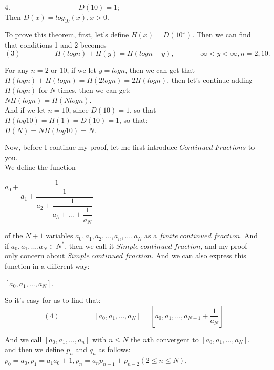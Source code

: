 \documentclass[12pt]{article}
\begin{document}
$4. \hspace{4cm} D(10)=1;$\\
Then $D(x)=log_{10}(x), x>0.$\\
\par To prove this theorem, first, let's define $H(x)=D(10^x)$. Then we can find that conditions 1 and 2 becomes
\begin{equation*}
(3)\hspace{2cm} H(logn)+H(y)=H(logn+y),\hspace{1cm} -\infty <y< \infty, n=2,10.
\end{equation*}
\par For any $n=2$ or $10$, if we let $y=logn$, then we can get that $H(logn)+H(logn)=H(2logn)=2H(logn)$, then let's continue adding $H(logn)$ for $N$ times, then we can get:\\
$NH(logn)=H(Nlogn)$.\\
And if we let $n=10$, since $D(10)=1$, so that $H(log10)=H(1)=D(10)=1$, so that:\\
$H(N)=NH(log10)=N$.\\
\par Now, before I continue my proof, let me first introduce $Continued\;Fractions$ to you.\\
We define the function \\
\begin{center}
$a_0+\dfrac{1}{a_1+\dfrac{1}{a_2+\dfrac{1}{a_3+...+\dfrac{1}{a_N}}}}$\\
\end{center}
of the $N+1$ variables $a_0,a_1,a_2,...,a_n,...,a_N$ as a $finite\;continued\;fraction$. And if $a_0,a_1,....a_N\in N^*$, then we call it $Simple\;continued\;fraction$, and my proof only concern about $Simple\;continued\;fraction$. And we can also express this function in a different way:
\begin{center}
$[a_0,a_1,...,a_N]$.\\
\end{center}
So it's easy for us to find that:
\begin{equation*}
(4)\hspace{2cm}[a_0,a_1,...,a_N]=[a_0,a_1,...,a_{N-1}+\dfrac{1}{a_N}]
\end{equation*}
\par And we call $[a_0,a_1,...,a_n]$ with $n\leq N$ the $n$th convergent to $[a_0,a_1,...,a_N]$.
and then we define $p_n$ and $q_n$ as follows:\\
$p_0=a_0, p_1=a_1a_0+1, p_n=a_np_{n-1}+p_{n-2} (2\leq n\leq N),$\\
\end{document}
